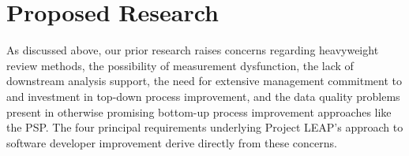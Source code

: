 


\section{Proposed Research}

As discussed above, our prior research raises concerns regarding
heavyweight review methods, the possibility of measurement dysfunction, the
lack of downstream analysis support, the need for extensive management
commitment to and investment in top-down process improvement, and the data
quality problems present in otherwise promising bottom-up process
improvement approaches like the PSP.  The four principal requirements
underlying Project LEAP's approach to software developer improvement derive
directly from these concerns.

